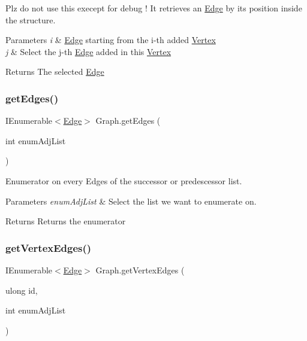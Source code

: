 Plz do not use this execept for debug ! It retrieves an \hyperlink{classEdge}{Edge} by its position inside the structure. 


\begin{DoxyParams}{Parameters}
{\em i} & \hyperlink{classEdge}{Edge} starting from the i-\/th added \hyperlink{structVertex}{Vertex}\\
\hline
{\em j} & Select the j-\/th \hyperlink{classEdge}{Edge} added in this \hyperlink{structVertex}{Vertex}\\
\hline
\end{DoxyParams}
\begin{DoxyReturn}{Returns}
The selected \hyperlink{classEdge}{Edge}
\end{DoxyReturn}
\mbox{\label{classGraph_a70efb9ad83b09661b3e395926848b108}} 
\subsubsection{\texorpdfstring{get\+Edges()}{getEdges()}}
{\footnotesize\ttfamily I\+Enumerable$<$\hyperlink{classEdge}{Edge}$>$ Graph.\+get\+Edges (\begin{DoxyParamCaption}\item[{int}]{enum\+Adj\+List }\end{DoxyParamCaption})\hspace{0.3cm}{\ttfamily [inline]}}



Enumerator on every Edges of the successor or predescessor list. 


\begin{DoxyParams}{Parameters}
{\em enum\+Adj\+List} & Select the list we want to enumerate on.\\
\hline
\end{DoxyParams}
\begin{DoxyReturn}{Returns}
Returns the enumerator
\end{DoxyReturn}
\mbox{\label{classGraph_a7ec7de88b4b0c0c103a3342dd2be2c12}} 
\subsubsection{\texorpdfstring{get\+Vertex\+Edges()}{getVertexEdges()}\hspace{0.1cm}{\footnotesize\ttfamily [1/2]}}
{\footnotesize\ttfamily I\+Enumerable$<$\hyperlink{classEdge}{Edge}$>$ Graph.\+get\+Vertex\+Edges (\begin{DoxyParamCaption}\item[{ulong}]{id,  }\item[{int}]{enum\+Adj\+List }\end{DoxyParamCaption})\hspace{0.3cm}{\ttfamily [inline]}}




